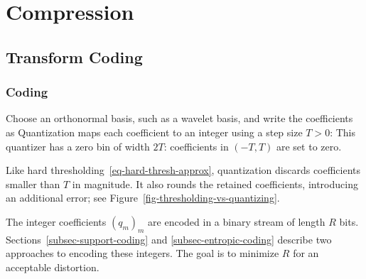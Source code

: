                                           

\chapter{Compression}


                                        
                                        
\section{Transform Coding}
\label{sec-transform-coding}

                                                                 
\subsection{Coding}

Choose an orthonormal basis, such as a wavelet basis, and write the coefficients as
Quantization maps each coefficient to an integer using a step size $T>0$:
This quantizer has a zero bin of width $2T$: coefficients in $(-T,T)$ are set to zero.

Like hard thresholding~\eqref{eq-hard-thresh-approx}, quantization discards coefficients smaller than $T$ in magnitude. It also rounds the retained coefficients, introducing an additional error; see Figure~\ref{fig-thresholding-vs-quantizing}.


The integer coefficients $(q_m)_m$ are encoded in a binary stream of length $R$ bits.
Sections~\ref{subsec-support-coding} and \ref{subsec-entropic-coding} describe two approaches to encoding these integers. The goal is to minimize $R$ for an acceptable distortion.

